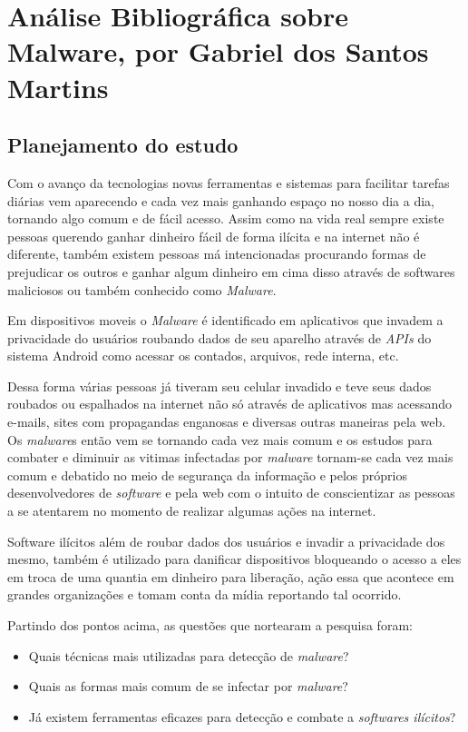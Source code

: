 \chapter{Análise Bibliográfica sobre Malware, por Gabriel dos Santos Martins\label{chap:bibliometria:gsmartins96}}

\section{Planejamento do estudo}

Com o avanço da tecnologias novas ferramentas e sistemas para facilitar tarefas diárias vem aparecendo e cada vez mais ganhando espaço no nosso dia a dia, tornando algo comum e de fácil acesso. Assim como na vida real sempre existe pessoas querendo ganhar dinheiro fácil de forma ilícita e na internet não é diferente, também existem pessoas má intencionadas procurando formas de prejudicar os outros e ganhar algum dinheiro em cima disso através de softwares maliciosos ou também conhecido como \textit{Malware}. 

Em dispositivos moveis o \textit{Malware} é identificado em aplicativos que invadem a privacidade do usuários roubando dados de seu aparelho através de \textit{APIs} do sistema {Android} como acessar os contados, arquivos, rede interna, etc.

Dessa forma várias pessoas já tiveram seu celular invadido e teve seus dados roubados ou espalhados na internet não só através de aplicativos mas acessando e-mails, sites com propagandas enganosas e diversas outras maneiras pela web. Os \textit{malware}s então vem se tornando cada vez mais comum e os estudos para combater e diminuir as vitimas infectadas por \textit{malware} tornam-se cada vez mais comum e debatido no meio de segurança da informação e pelos próprios desenvolvedores de \textit{software} e pela web com o intuito de conscientizar as pessoas a se atentarem no momento de realizar algumas ações na internet.

Software ilícitos além de roubar dados dos usuários e invadir a privacidade dos mesmo, também é utilizado para danificar dispositivos bloqueando o acesso a eles em troca de uma quantia em dinheiro para liberação, ação essa que acontece em grandes organizações e tomam conta da mídia reportando tal ocorrido. 

Partindo dos pontos acima, as questões que nortearam a pesquisa foram:
\begin{itemize}
    \item Quais técnicas mais utilizadas para detecção de \textit{malware}?
    \item Quais as formas mais comum de se infectar por \textit{malware}?
    \item Já existem ferramentas eficazes para detecção e combate a \textit{softwares ilícitos}?
\end{itemize}

